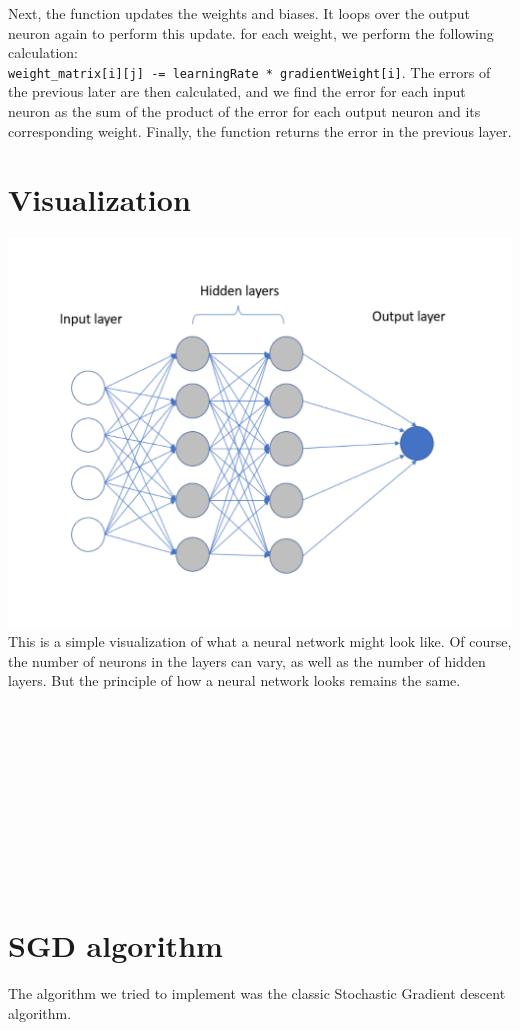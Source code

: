 \documentclass[12pt, twocolumn]{report}
\begin{document}
Next, the function updates the weights and biases. It loops over the output neuron again to perform this update. for each weight, we perform the following calculation: \\
\texttt{weight\_matrix[i][j] -= learningRate * gradientWeight[i]}. The errors of the previous later are then calculated, and we find the error for each input neuron as the sum
of the product of the error for each output neuron and its corresponding weight. Finally, the function returns the error in the previous layer.
\\
\section*{Visualization}
\includegraphics[width=\linewidth]{NN_Image.pdf}
This is a simple visualization of what a neural network might look like. Of course, the number of neurons in the layers can vary, 
as well as the number of hidden layers. But the principle of how a neural network looks remains the same. 
\\ \\ \\ \\ \\ \\ \\ \\ \\ \\ \\
\section*{SGD algorithm}
The algorithm we tried to implement was the classic Stochastic Gradient descent algorithm.
\end{document}
